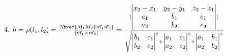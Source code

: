 4. $h = \rho(l_1, l_2) = \frac{ |\bvec{M_1M_2}\vec{m_1}\vec{m_2}| }{ |\vec{m_1}\times\vec{m_2}| }=
\frac{ |\begin{vmatrix}x_2-x_1&y_2-y_1&z_2-z_1\\a_1&b_1&c_1\\a_2&b_2&c_2\end{vmatrix}| }
    {\sqrt{\begin{vmatrix}b_1&c_1\\b_2&c_2\end{vmatrix}^2+
    \begin{vmatrix}a_1&c_1\\a_2&c_2\end{vmatrix}^2+
    \begin{vmatrix}a_1&b_1\\a_2&b_2\end{vmatrix}^2}}$

